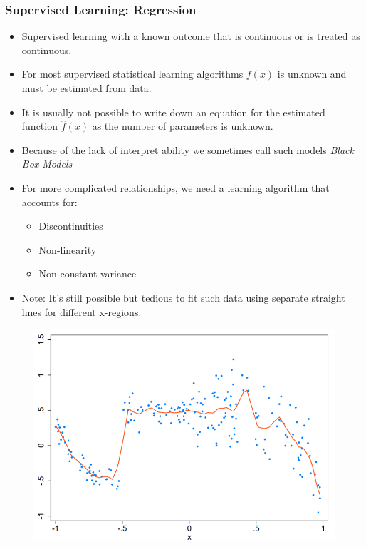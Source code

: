 \documentclass[12pt, oneside]{article}
\begin{document}
\subsubsection{Supervised Learning: Regression}
\begin{itemize}
    \item Supervised learning with a known outcome that is continuous or is treated as continuous. 
    \item For most supervised statistical learning algorithms $f(x)$ is unknown and must be estimated from data.
    \item It is usually not possible to write down an equation for the estimated function $\widehat{f}(x)$ as the number of parameters is unknown. 
    \item Because of the lack of interpret ability we sometimes call such models \emph{Black Box Models}
    \item For more complicated relationships, we need a learning algorithm that accounts for: 
    \begin{itemize}
        \item Discontinuities
        \item Non-linearity
        \item Non-constant variance
    \end{itemize}
    \item Note: It's still possible but tedious to fit such data using separate straight lines for different x-regions.
\end{itemize}
\begin{figure}[!ht]
    \centering
    \includegraphics[width=\textwidth]{Regression with one x-variable.png}        
    \label{fig:my_label}
\end{figure}
\end{document}
